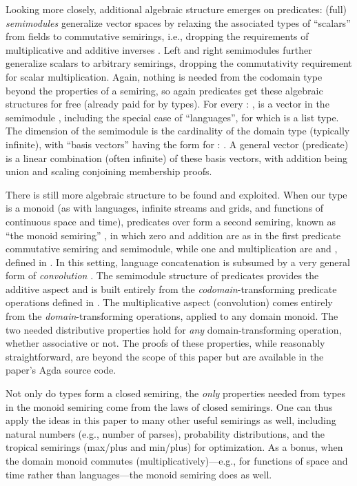 \documentclass[acmsmall,screen]{acmart}
\begin{document}
Looking more closely, additional algebraic structure emerges on predicates: (full) \emph{semimodules} generalize vector spaces by relaxing the associated types of ``scalars'' from fields to commutative semirings, i.e., dropping the requirements of multiplicative and additive inverses \needcite{}.
Left and right semimodules further generalize scalars to arbitrary semirings, dropping the commutativity requirement for scalar multiplication.
Again, nothing is needed from the codomain type  beyond the properties of a semiring, so again predicates get these algebraic structures for free (already paid for by types).
For every { \AS :  },  is a vector in the semimodule { }, including the special case of ``languages'', for which  is a list type.
The dimension of the semimodule is the cardinality of the domain type  (typically infinite), with ``basis vectors'' having the form { } for { \AS : }.
A general vector (predicate) is a linear combination (often infinite) of these basis vectors, with addition being union and scaling conjoining membership proofs.

There is still more algebraic structure to be found and exploited.
When our  type  is a monoid (as with languages, infinite streams and grids, and functions of continuous space and time), predicates over  form a second semiring, known as ``the monoid semiring'' \needcite{}, in which zero and addition are as in the first predicate commutative semiring and semimodule, while one and multiplication are  and , defined in .
In this setting, language concatenation is subsumed by a very general form of \emph{convolution} \needcite{}.
The semimodule structure of predicates provides the additive aspect and is built entirely from the \emph{codomain}-transforming predicate operations defined in .
The multiplicative aspect (convolution) comes entirely from the \emph{domain}-transforming operations, applied to any domain monoid.
The two needed distributive properties hold for \emph{any} domain-transforming operation, whether associative or not.
The proofs of these properties, while reasonably straightforward, are beyond the scope of this paper but are available in the paper's Agda source code.

Not only do types form a closed semiring, the \emph{only} properties needed from types in the monoid semiring come from the laws of closed semirings.
One can thus apply the ideas in this paper to many other useful semirings as well, including natural numbers (e.g., number of parses), probability distributions, and the tropical semirings (max/plus and min/plus) for optimization.
As a bonus, when the domain monoid commutes (multiplicatively)---e.g., for functions of space and time rather than languages---the monoid semiring does as well.
\end{document}

